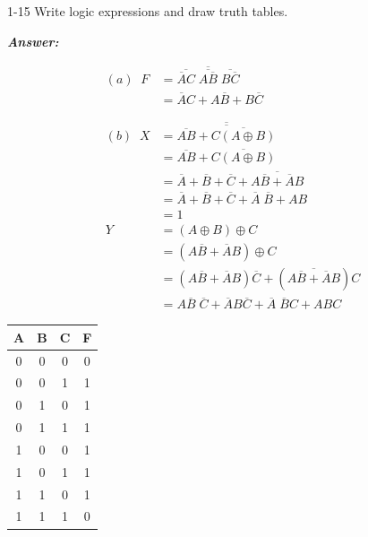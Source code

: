 \documentclass[12pt]{article}
\newenvironment{Answer}{
  \vspace{12pt}
  {\large\textbf{\textit{\hspace{-12pt}Answer:}}}\par
  \vspace{8pt}
} {\vspace{24pt}}
\begin{document}
\begin{question}{}{}
  1-15 Write logic expressions and draw truth tables.
\end{question}
\begin{Answer}
\noindent\begin{minipage}{0.5\textwidth}
\begin{align*}
(a)\;\; F &=\overline{\overline{\overline AC}\;\overline{A\overline B}\;\overline{B \overline C}}\\
  &=\overline AC+A\overline B+B\overline C \\
  \; \\
  \; \\
(b)\;\; X &= \overline{\overline{\overline{AB}+\overline{C(A\oplus B)}}} \\
    &=\overline{AB}+\overline{C(A\oplus B)} \\
    &=\overline A+\overline B+\overline C+\overline{A\overline B+\overline AB} \\
    &=\overline A+\overline B+\overline C+\overline A\;\overline B+AB \\
    &=1\\
  Y &=(A\oplus B)\oplus C \\
    &=(A\overline B+\overline AB)\oplus C \\
    &=(A\overline B+\overline AB)\overline C+(\overline{A\overline B+\overline AB})C \\
    &=A\overline B\;\overline C+\overline AB\overline C+\overline A\;\overline BC+ABC
\end{align*}
\end{minipage}\begin{minipage}{0.5\textwidth}
\begin{center}\begin{tabular}{|c|c|c|c|}\hline
A & B & C & F \\ \hline
0 & 0 & 0 & 0 \\ \hline
0 & 0 & 1 & 1 \\ \hline
0 & 1 & 0 & 1 \\ \hline
0 & 1 & 1 & 1 \\ \hline
1 & 0 & 0 & 1 \\ \hline
1 & 0 & 1 & 1 \\ \hline
1 & 1 & 0 & 1 \\ \hline
1 & 1 & 1 & 0 \\ \hline
\end{tabular}\end{center}
\begin{center}\begin{tabular}{|c|c|c|c|c|}\hline

\end{tabular}
\end{center}
\end{minipage}
\end{Answer}
\end{document}
